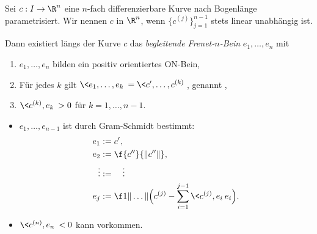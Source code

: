 \begin{df}
	Sei $c: I \to \R^n$ eine $n$-fach differenzierbare Kurve nach Bogenlänge parametrisiert.
	Wir nennen $c$  in $\R^n$, wenn $\{c^{(j)}\}_{j=1}^{n-1}$ stets linear unabhängig ist.

	Dann existiert längs der Kurve $c$ das \emph{begleitende Frenet-$n$-Bein} $e_1, \dotsc, e_n$ mit
	\begin{enumerate}[1)]
		\item
			$e_1, \dotsc, e_n$ bilden ein positiv orientiertes ON-Bein,
		\item
			Für jedes $k$ gilt $\<e_1, \dotsc, e_k\> = \<c', \dotsc, c^{(k)}\>$, genannt ,
		\item
			$\<c^{(k)}, e_k\> > 0$ für $k = 1, \dotsc, n-1$.
	\end{enumerate}
	\begin{note}
		\begin{itemize}
			\item
				$e_1, \dotsc, e_{n-1}$ ist durch Gram-Schmidt bestimmt:
				\begin{align*}
					e_1 &:= c', \\
					e_2 &:= \f{c''}{\|c''\|}, \\
					\vdots &:= \quad \vdots \\
					e_j &:= \f 1{\|\dots\|} \Big( c^{(j)} - \sum_{i=1}^{j-1} \<c^{(j)}, e_i\>e_i \Big).
				\end{align*}
			\item
				$\<c^{(n)}, e_n\> < 0$ kann vorkommen.
		\end{itemize}
	\end{note}
\end{df}


